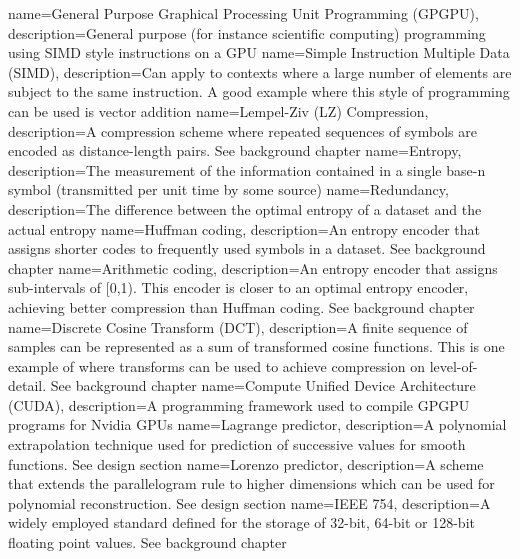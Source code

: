  {
  name={General Purpose Graphical Processing Unit Programming (GPGPU)},
  description={General purpose (for instance scientific computing) programming using SIMD style instructions on a GPU}
 }
 {
  name={Simple Instruction Multiple Data (SIMD)},
  description={Can apply to contexts where a large number of elements are subject to the same instruction. A good example where this style of programming
  can be used is vector addition}
 }
 {
  name={Lempel-Ziv (LZ) Compression},
  description={A compression scheme where repeated sequences of symbols are encoded as distance-length pairs. See background chapter}
 }
 {
  name={Entropy},
  description={The measurement of the information contained in a single base-n symbol (transmitted per unit time by some source)}
 }
 {
  name={Redundancy},
  description={The difference between the optimal entropy of a dataset and the actual entropy}
 }
 {
  name={Huffman coding},
  description={An entropy encoder that assigns shorter codes to frequently used symbols in a dataset. See background chapter}
 }
 {
  name={Arithmetic coding},
  description={An entropy encoder that assigns sub-intervals of [0,1). This encoder is closer to an optimal entropy encoder, achieving better compression than 
  Huffman coding. See background chapter}
 }
 {
  name={Discrete Cosine Transform (DCT)},
  description={A finite sequence of samples can be represented as a sum of transformed cosine functions. This is one example of where transforms can be used to
  achieve compression on level-of-detail. See background chapter}
 }
 {
  name={Compute Unified Device Architecture (CUDA)},
  description={A programming framework used to compile GPGPU programs for Nvidia GPUs}
 } 
 {
  name={Lagrange predictor},
  description={A polynomial extrapolation technique used for prediction of successive values for smooth functions. See design section}
 } 
 {
  name={Lorenzo predictor},
  description={A scheme that extends the parallelogram rule to higher dimensions which can be used for polynomial reconstruction. See design section}
 } 
 {
  name={IEEE 754},
  description={A widely employed standard defined for the storage of 32-bit, 64-bit or 128-bit floating point values. See background chapter}
 } 
